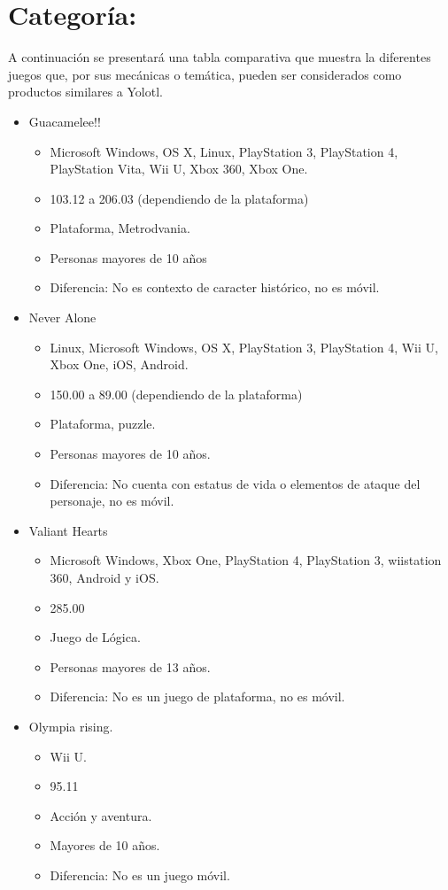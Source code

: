 	\section{Categoría:}
A continuación se presentará una tabla comparativa que muestra la diferentes juegos que, por sus mecánicas o temática, pueden ser considerados como productos similares a Yolotl.
\begin{itemize}
	\item Guacamelee!!
	\begin{itemize}
		\item Microsoft Windows, OS X, Linux, PlayStation 3, PlayStation 4, PlayStation Vita, Wii U, Xbox 360, Xbox One.
		\item 103.12 a 206.03 (dependiendo de la plataforma)
		\item Plataforma, Metrodvania.
		\item Personas mayores de 10 años
		\item Diferencia: No es contexto de caracter histórico, no es móvil.
	\end{itemize}

\item Never Alone
\begin{itemize}
	\item Linux, Microsoft Windows, OS X, PlayStation 3, PlayStation 4, Wii U, Xbox One, iOS, Android.
	\item 150.00 a 89.00 (dependiendo de la plataforma)
	\item Plataforma, puzzle.
	\item Personas mayores de 10 años.
	\item Diferencia: No cuenta con estatus de vida o elementos de ataque del personaje, no es móvil.
\end{itemize}


\item Valiant Hearts
\begin{itemize}
	\item Microsoft Windows, Xbox One, PlayStation 4, PlayStation 3, wiistation 360, Android y iOS.
	\item 285.00
	\item Juego de Lógica. 
	\item Personas mayores de 13 años.
	\item Diferencia: No es un juego de plataforma, no es móvil.
\end{itemize}


\item Olympia rising.
\begin{itemize}
	\item Wii U.
	\item 95.11
	\item Acción y aventura.
	\item Mayores de 10 años.
	\item Diferencia: No es un juego móvil.
\end{itemize}



\end{itemize}
